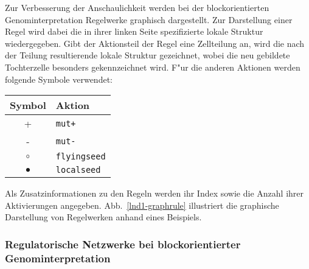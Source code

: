 Zur Verbesserung der Anschaulichkeit
werden bei der blockorientierten Genominterpretation Regelwerke graphisch dargestellt.
Zur Darstellung einer Regel wird dabei die in ihrer linken Seite spezifizierte
lokale Struktur wiedergegeben. Gibt der Aktionsteil der Regel eine Zellteilung an, wird
die nach der Teilung resultierende lokale Struktur gezeichnet, wobei die neu gebildete
Tochterzelle besonders gekennzeichnet wird. F"ur die anderen Aktionen werden folgende
Symbole verwendet:

\medskip
\begin{tabular}{|c|l|} \hline
Symbol & Aktion \\ \hline
+ & \verb|mut+| \\
- & \verb|mut-| \\
$\circ$ & \verb|flyingseed| \\
$\bullet$ & \verb|localseed| \\ \hline
\end{tabular}
\medskip

Als Zusatzinformationen zu den Regeln werden ihr Index sowie die Anzahl ihrer
Aktivierungen angegeben.
Abb.\ \ref{lnd1-graphrule} illustriert die graphische Darstellung von Regelwerken anhand
eines Beispiels.


\subsubsection{Regulatorische Netzwerke bei blockorientierter Genominterpretation}

